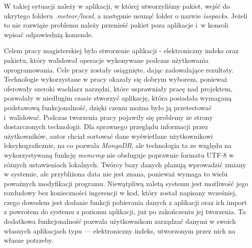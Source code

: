 \documentclass[openright]{xmgr}
\begin{document}
W takiej sytuacji należy w aplikacji, w której utworzyliśmy pakiet, wejść do ukrytego folderu \textit{.meteor/local}, a następnie usunąć folder o nazwie \textit{isopacks}. Jeżeli to nie rozwiąże problemu należy przenieść pakiet poza aplikacje i~w konsoli wpisać odpowiednią komende.


\summary
\indent \indent \indent Celem pracy magisterskiej było stworzenie aplikacji - elektroniczny indeks oraz pakietu, który walidował operacje wykonywane podczas użytkowania oprogramowania. Cele pracy zostały osiągnięte, dając zadowalające rezultaty.
\newline \newline
Technologie wykorzystane w pracy okazały się dobrym wyborem, ponieważ oferowały szeroki wachlarz narzędzi, które usprawniały pracę nad projektem, pozwalały w niedługim czasie stworzyć aplikację, która posiadała wymaganą podstawową funkcjonalność, dzięki czemu można było ją przetestować i~walidować.
\newline \newline
Podczas tworzenia pracy pojawiły się problemy ze strony dostarczonych technologii. Dla sprawnego przeglądu informacji przez użytkowników, autor chciał sortować dane wyświetlane użytkownikowi leksykograficznie, na co pozwala \textit{MongoDB}, ale technologia ta ze względu na wykorzystywaną funkcję \textit{memcmp} nie obsługuje poprawnie formatu UTF-8 w różnych ustawieniach lokalnych. Twórcy bazy danych planują wprowadzić zmiany w systemie, ale przybliżona data nie jest znana, ponieważ wymaga to wielu poważnych modyfikacji programu.
\newline \newline
Niewątpliwą zaletą systemu jest możliwość jego rozdudowy bez konieczności ingerencji w kod, który został napisany wcześniej, czego dowodem jest dodanie funkcji pobierania danych z aplikacji oraz ich import z powrotem do systemu z poziomu aplikacji, już po zakończeniu jej tworzenia. Ta dodatkowa funkcjonalność pozwala użytkownikom zarządzać danymi w swoich własnych aplikacjach typu --- elektroniczny indeks, utworzonym przez nich na własne potrzeby.







\listoffigures

\oswiadczenie
\end{document}
